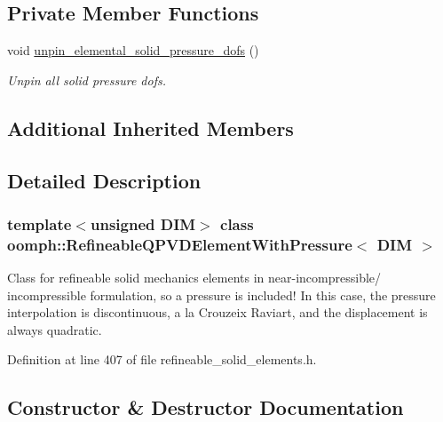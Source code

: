 \subsection*{Private Member Functions}
\begin{DoxyCompactItemize}
\item 
void \hyperlink{classoomph_1_1RefineableQPVDElementWithPressure_adaf40f1a0ccadd63499e6c555f6b23ee}{unpin\+\_\+elemental\+\_\+solid\+\_\+pressure\+\_\+dofs} ()
\begin{DoxyCompactList}\small\item\em Unpin all solid pressure dofs. \end{DoxyCompactList}\end{DoxyCompactItemize}
\subsection*{Additional Inherited Members}


\subsection{Detailed Description}
\subsubsection*{template$<$unsigned D\+IM$>$\newline
class oomph\+::\+Refineable\+Q\+P\+V\+D\+Element\+With\+Pressure$<$ D\+I\+M $>$}

Class for refineable solid mechanics elements in near-\/incompressible/ incompressible formulation, so a pressure is included! In this case, the pressure interpolation is discontinuous, a la Crouzeix Raviart, and the displacement is always quadratic. 

Definition at line 407 of file refineable\+\_\+solid\+\_\+elements.\+h.



\subsection{Constructor \& Destructor Documentation}
\mbox{\label{classoomph_1_1RefineableQPVDElementWithPressure_a7d1562f43683b3375c5fe0c4983b6db7}} 
